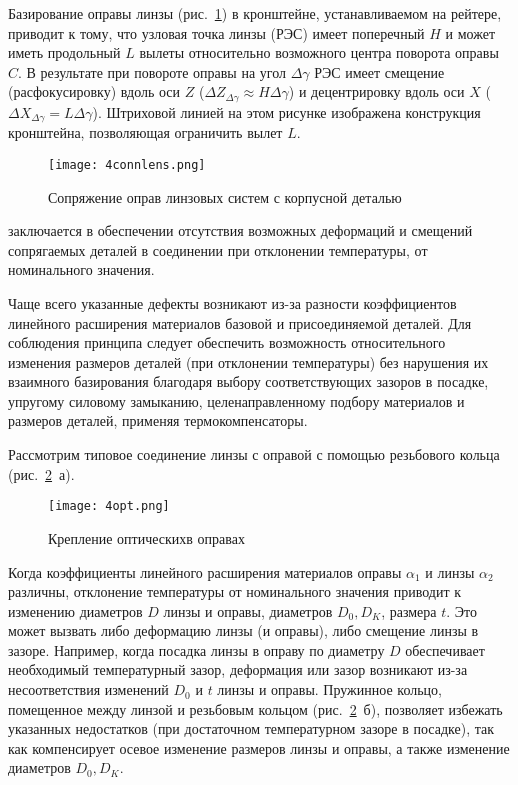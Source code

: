 Базирование оправы линзы (рис.~\ref{pic:4connlens}) в кронштейне, устанавливаемом на рейтере, приводит к тому, что узловая точка линзы (РЭС) имеет поперечный $ H $ и может иметь продольный $ L $ вылеты относительно возможного центра поворота оправы $ C $. В результате при повороте оправы на угол $ \Delta\gamma $  РЭС имеет смещение (расфокусировку) вдоль оси $ Z $ ($ \Delta Z_{\Delta\gamma} \approx H\Delta\gamma$) и децентрировку вдоль оси $ X $ ($ \Delta X_{\Delta\gamma} = L\Delta\gamma $). Штриховой линией на этом рисунке изображена конструкция кронштейна, позволяющая ограничить вылет $ L $.

\begin{figure}[h!]
	\begin{center}
		\caption{Сопряжение оправ линзовых систем с корпусной деталью}
		\texttt{[image: 4connlens.png]}
		\label{pic:4connlens}
	\end{center}
\end{figure}

 заключается в обеспечении отсутствия возможных деформаций и смещений сопрягаемых деталей в соединении при отклонении температуры, от номинального значения.

Чаще всего указанные дефекты возникают из-за разности коэффициентов линейного расширения материалов базовой и присоединяемой деталей. 
Для соблюдения принципа следует обеспечить возможность относительного изменения размеров деталей (при отклонении температуры) без нарушения их взаимного базирования благодаря выбору соответствующих зазоров в посадке, упругому силовому замыканию, целенаправленному подбору материалов и размеров деталей, применяя термокомпенсаторы.

Рассмотрим типовое соединение линзы с оправой с помощью резьбового кольца (рис.~\ref{pic:4opt}~а).
\begin{figure}[h!]
	\begin{center}
		\caption[Крепление оптических деталей в оправах]{Крепление оптических в оправах}
		\texttt{[image: 4opt.png]}
		\label{pic:4opt}
	\end{center}
\end{figure}

Когда коэффициенты линейного расширения материалов оправы $ \alpha_1 $ и линзы $ \alpha_2 $ различны, отклонение температуры от номинального значения приводит к изменению диаметров $ D $ линзы и оправы, диаметров $ D_0, D_K $, размера $ t $. Это может вызвать либо деформацию линзы (и оправы), либо смещение линзы в зазоре. Например, когда посадка линзы в оправу по диаметру $ D $ обеспечивает необходимый температурный зазор, деформация или зазор возникают из-за несоответствия изменений $ D_0 $ и $ t $ линзы и оправы. Пружинное кольцо, помещенное между линзой и резьбовым кольцом (рис.~\ref{pic:4opt}~б), позволяет избежать указанных недостатков (при достаточном температурном зазоре в посадке), так как компенсирует осевое изменение размеров линзы и оправы, а также изменение диаметров $ D_0, D_K $.

